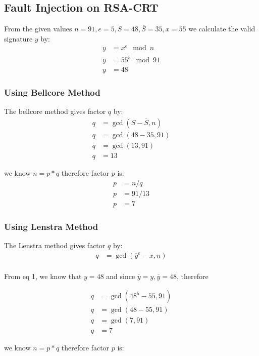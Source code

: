 \documentclass[1p,16pt]{elsarticle}
\begin{document}
\subsection{Fault Injection on RSA-CRT}%
\label{sub:fault_injection_on_rsa_crt}
From the given values
$n=91, e=5, S=48, \overline{S}=35, x=55$
we calculate the valid signature $y$ by:
\begin{align}
	y &= x^e \mod n \\
	y &= 55^5 \mod 91 \\
	y & = 48
\end{align}

\subsubsection{Using Bellcore Method}%
\label{sub:ballcore_method}
The bellcore method gives factor $q$ by:
\begin{align}
	q &= \gcd(S - \overline{S}, n) \\
	q &= \gcd(48 - 35, 91) \\
	q &= \gcd(13, 91) \\
	q &= 13
\end{align}

we know $n = p * q$ therefore factor $p$ is:
\begin{align}
	p &= n / q \\
	p &= 91 / 13 \\
	p &= 7
\end{align}


\subsubsection{Using Lenstra Method}%
\label{sub:lenstra_method}
The Lenstra method gives factor $q$ by:
\begin{align}
	q &= \gcd(\overline{y}^e - x, n) \\
\end{align}

From eq 1, we know that $y=48$ and since
$\overline{y} = y, \overline{y} = 48$, therefore

\begin{align}
	q &= \gcd(48^5 - 55, 91) \\
	q &= \gcd(48 - 55, 91) \\
	q &= \gcd(7, 91) \\
	q &= 7
\end{align}

we know $n = p * q$ therefore factor $p$ is:
\end{document}
